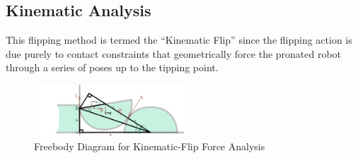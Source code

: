 \documentclass[letterpaper]{report}
\begin{document}

\subsection{Kinematic Analysis}
This flipping method is termed the ``Kinematic Flip'' since the flipping action is due purely to contact constraints that geometrically force the pronated robot through a series of poses up to the tipping point.

\begin{figure}[ht]
\centering
\includegraphics[width=0.5\textwidth]{Kin_FreeBodyDiagram.png}
\caption{\label{fig:Freebody}Freebody Diagram for Kinematic-Flip Force Analysis}
\end{figure}
\end{document}
